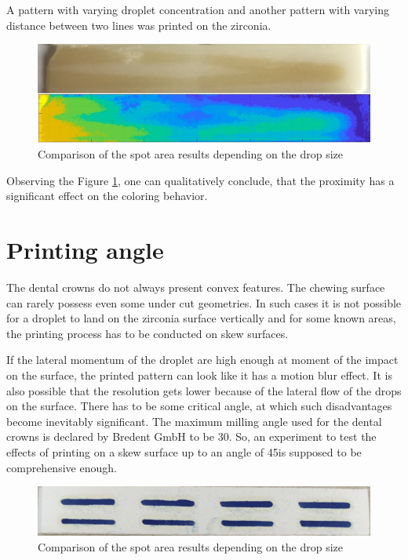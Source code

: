 \bigskip

A pattern with varying droplet concentration and another pattern with varying distance between two lines was printed on the zirconia.

\bigskip

\begin{figure}[H]
	\centering
	\includegraphics[width=1\textwidth]{grafiken/proximitysinter.jpg}
	\caption{Comparison of the spot area results depending on the drop size}
	\label{fig:proximitysinter}
\end{figure} 

\bigskip

Observing the Figure \ref{fig:proximitysinter}, one can qualitatively conclude, that the proximity has a significant effect on the coloring behavior.


\section{Printing angle}
The dental crowns do not always present convex features. The chewing surface can rarely possess even some under cut geometries. In such cases it is not possible for a droplet to land on the zirconia surface vertically and for some known areas, the printing process has to be conducted on skew surfaces. 

If the lateral momentum of the droplet are high enough at moment of the impact on the surface, the printed pattern can look like it has a motion blur effect. It is also possible that the resolution gets lower because of the lateral flow of the drops on the surface. There has to be some critical angle, at which such disadvantages become inevitably  significant. The maximum milling angle used for the dental crowns is declared by Bredent GmbH to be 30\textdegree. So, an experiment to test the effects of printing on a skew surface up to an angle of 45\textdegree is supposed to be comprehensive enough.

	\bigskip

	\begin{figure}[H]
		\centering
		\includegraphics[width=1\textwidth]{grafiken/angleprint.jpg}
		\caption{Comparison of the spot area results depending on the drop size}
		\label{fig:angleprint}
	\end{figure} 


